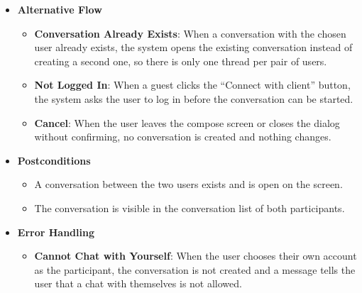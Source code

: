 \begin{itemize}[leftmargin=1.6em,topsep=4pt,itemsep=3pt,parsep=0pt,label=$\bullet$]
\begin{itemize}[leftmargin=2.2em,topsep=2pt,itemsep=3pt,parsep=0pt,label=$\circ$]
\begin{itemize}[leftmargin=2.2em,topsep=2pt,itemsep=3pt,parsep=0pt,label=$\blacksquare$]
                    \item When no conversation exists, a new conversation between the two users is created.
                    \item When a conversation already exists, that conversation is reopened, including a conversation that the user had previously deleted from their own list.
                \end{itemize}
            \item \textbf{Write the First Message}: The compose screen shows the name and avatar of the other participant, and the user can type and send the first message (see \textbf{Send Message}).
        \end{itemize}
    \item \textbf{Alternative Flow}
        \begin{itemize}[leftmargin=2.2em,topsep=2pt,itemsep=3pt,parsep=0pt,label=$\circ$]
            \item \textbf{Conversation Already Exists}: When a conversation with the chosen user already exists, the system opens the existing conversation instead of creating a second one, so there is only one thread per pair of users.
            \item \textbf{Not Logged In}: When a guest clicks the ``Connect with client'' button, the system asks the user to log in before the conversation can be started.
            \item \textbf{Cancel}: When the user leaves the compose screen or closes the dialog without confirming, no conversation is created and nothing changes.
        \end{itemize}
    \item \textbf{Postconditions}
        \begin{itemize}[leftmargin=2.2em,topsep=2pt,itemsep=3pt,parsep=0pt,label=$\circ$]
            \item A conversation between the two users exists and is open on the screen.
            \item The conversation is visible in the conversation list of both participants.
        \end{itemize}
    \item \textbf{Error Handling}
        \begin{itemize}[leftmargin=2.2em,topsep=2pt,itemsep=3pt,parsep=0pt,label=$\circ$]
            \item \textbf{Cannot Chat with Yourself}: When the user chooses their own account as the participant, the conversation is not created and a message tells the user that a chat with themselves is not allowed.

\end{itemize}
\end{itemize}
